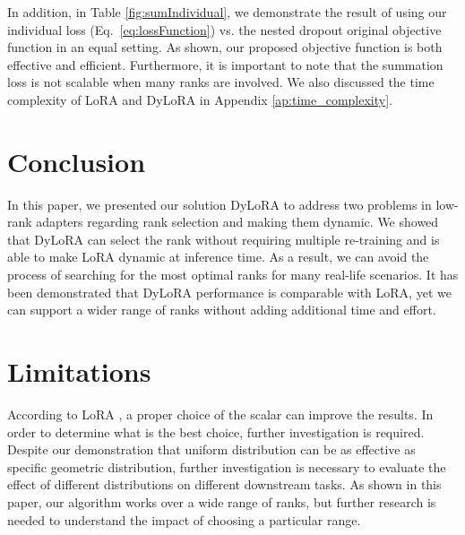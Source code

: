 In addition, in Table \ref{fig:sumIndividual}, we demonstrate the result of using our individual loss (Eq.~\ref{eq:lossFunction}) vs. the nested dropout original objective function in an equal setting. As shown, our proposed objective function is both effective and efficient. Furthermore, it is important to note that the summation loss is not scalable when many ranks are involved. We also discussed the time complexity of LoRA and DyLoRA in Appendix \ref{ap:time_complexity}.

\section{Conclusion}

In this paper, we presented our solution DyLoRA to address two problems in low-rank adapters regarding rank selection and making them dynamic. We showed that DyLoRA can select the rank without requiring multiple re-training and is able to make LoRA dynamic at inference time. As a result, we can avoid the process of searching for the most optimal ranks for many real-life scenarios. It has been demonstrated that DyLoRA performance is comparable with LoRA, yet we can support a wider range of ranks without adding additional time and effort.

\section*{Limitations}

According to LoRA \cite{hu2021lora}, a proper choice of the scalar can improve the results. In order to determine what is the best choice, further investigation is required. Despite our demonstration that uniform distribution can be as effective as specific geometric distribution, further investigation is necessary to evaluate the effect of different distributions on different downstream tasks. As shown in this paper, our algorithm works over a wide range of ranks, but further research is needed to understand the impact of choosing a particular range.


